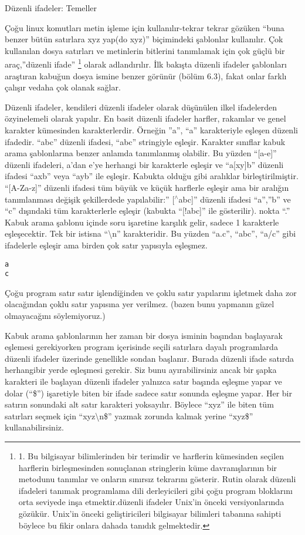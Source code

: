 \begin{section}{Düzenli ifadeler: Temeller}

Çoğu linux komutları metin işleme için kullanılır-tekrar tekrar gözüken “buna benzer bütün satırlara xyz yap(do xyz)” biçimindeki şablonlar kullanılır. Çok kullanılan dosya satırları ve metinlerin bitlerini tanımlamak için çok güçlü bir araç,”düzenli ifade” 
\footnote{1.	Bu bilgisayar bilimlerinden bir terimdir ve harflerin kümesinden seçilen harflerin birleşmesinden sonuçlanan stringlerin küme davranışlarının bir metodunu tanımlar ve onların sınırsız tekrarını gösterir. Rutin olarak düzenli ifadeleri tanımak programlama dili derleyicileri gibi çoğu program bloklarını orta seviyede inşa etmektir.düzenli ifadeler Unix’in önceki versiyonlarında gözükür. Unix’in önceki geliştiricileri bilgisayar bilimleri tabanına sahipti böylece bu fikir onlara dahada tanıdık gelmektedir.}  olarak adlandırılır. İlk bakışta düzenli ifadeler şablonları araştıran kabuğun dosya ismine benzer görünür (bölüm 6.3), fakat onlar farklı çalışır vedaha çok olanak sağlar. 

Düzenli ifadeler, kendileri düzenli ifadeler olarak düşünülen ilkel ifadelerden özyinelemeli olarak yapılır. En basit düzenli ifadeler harfler, rakamlar ve genel karakter kümesinden karakterlerdir. Örneğin ”a”, “a” karakteriyle eşleşen düzenli ifadedir. “abc” düzenli ifadesi, “abc” stringiyle  eşleşir. Karakter sınıflar kabuk arama şablonlarına benzer anlamda tanımlanmış olabilir. Bu yüzden “[a-e]” düzenli ifadeleri, a’dan e’ye herhangi bir karakterle eşleşir ve “a[xy]b” düzenli ifadesi “axb” veya “ayb” ile eşleşir. Kabukta olduğu gibi aralıklar birleştirilmiştir. “[A-Za-z]” düzenli ifadesi tüm büyük ve küçük harflerle eşleşir ama bir aralığın tanımlanması değişik şekillerdede yapılabilir:” [$ ^\wedge $abc]” düzenli ifadesi  “a”,”b” ve “c” dışındaki tüm karakterlerle eşleşir (kabukta “[!abc]” ile gösterilir). nokta “.” Kabuk arama şablonu içinde soru işaretine karşılık gelir, sadece 1 karakterle eşleşecektir. Tek bir istisna “\textbackslash n” karakteridir. Bu yüzden “a.c”, “abc”, “a/c” gibi ifadelerle eşleşir ama birden çok satır yapısıyla eşleşmez.
\begin{verbatim}
a
c
\end{verbatim}

Çoğu program satır satır işlendiğinden  ve çoklu satır yapılarını işletmek daha zor olacağından çoklu satır yapısına yer verilmez. (bazen bunu yapmanın güzel olmayacağını söylemiyoruz.)

Kabuk arama şablonlarının her zaman bir dosya isminin başından başlayarak  eşlemesi gerekiyorken program içerisinde seçili satırlara dayalı programlarda düzenli ifadeler üzerinde genellikle sondan başlanır. Burada düzenli ifade satırda herhangibir yerde eşleşmesi gerekir.  Siz bunu ayırabilirsiniz ancak bir şapka karakteri ile başlayan düzenli ifadeler yalnızca satır başında eşleşme yapar ve dolar (“\$”) işaretiyle biten bir ifade sadece satır sonunda eşleşme yapar. Her bir satırın sonundaki alt satır karakteri yoksayılır. Böylece “xyz” ile biten tüm satırları seçmek için “xyz\textbackslash n\$” yazmak zorunda kalmak yerine “xyz\$” kullanabilirsiniz.


\end{section}

